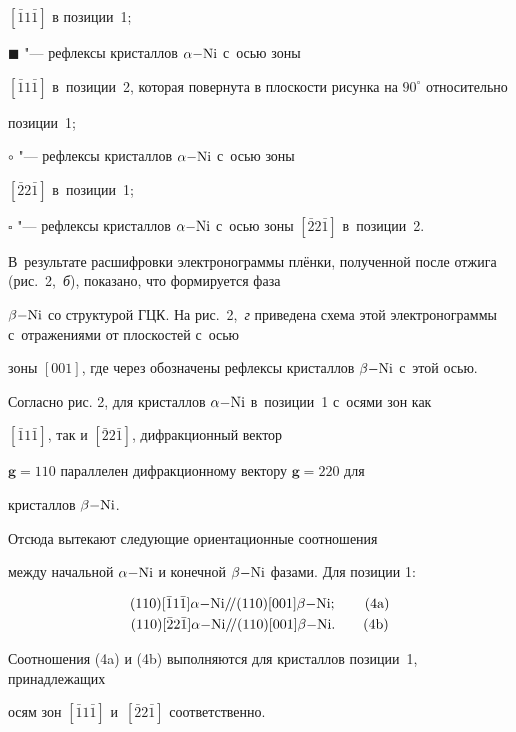 $[\bar {1}1\bar {1}]$ в позиции~1;

$\scriptscriptstyle \blacksquare $ "--- рефлексы кристаллов $\alpha \rm{-}Ni$ с~осью зоны

$[\bar {1}1\bar {1}]$ в~позиции~2, которая повернута в плоскости рисунка на $90^\circ$ относительно

позиции~1;

$\circ $ "--- рефлексы кристаллов $\alpha \rm{-}Ni$ с~осью зоны

$[\bar {2}2\bar {1}]$ в~позиции~1;

$\scriptscriptstyle \square $ "--- рефлексы кристаллов $\alpha \rm{-}Ni$ с~осью зоны $[\bar {2} 2\bar {1}]$ в~позиции~2.

В~результате расшифровки электронограммы плёнки, полученной после отжига (рис.~2,~{\sl б}), показано, что формируется фаза

$\beta \rm{-}Ni$ со структурой ГЦК. На рис.~2,~{\sl г} приведена схема этой электронограммы с~отражениями от плоскостей с~осью

зоны $[001]$, где через  обозначены рефлексы кристаллов $\beta\rm{-}Ni$ с~этой осью.





Согласно рис. 2, для кристаллов $\alpha \rm{-}Ni$ в~позиции~1 с~осями зон как

$[\bar {1}1\bar {1}]$, так и $[\bar {2}2\bar {1}]$, дифракционный вектор

$\textbf{g} = 110$ параллелен дифракционному вектору $\textbf{g} = 220$ для

кристаллов $\beta \rm{-}Ni$.

Отсюда вытекают следующие ориентационные соотношения

между начальной $\alpha \rm{-}Ni$ и конечной $\beta \rm{-}Ni$ фазами. Для позиции 1:

\begin{gather}

(110)[\bar {1}1\bar {1}]\alpha \rm{-}Ni/\!/(110)[001]\beta \rm{-}Ni; \tag{4a}\\

(110)[\bar {2}2\bar {1}]\alpha \rm{-}Ni/\!/(110)[001]\beta \rm{-}Ni. \tag{4b}

\end{gather}

Соотношения (4a) и (4b) выполняются для кристаллов позиции~1, принадлежащих

осям зон $[\bar {1}1\bar {1}]$ и~$[\bar {2}2\bar {1}]$ соответственно.



